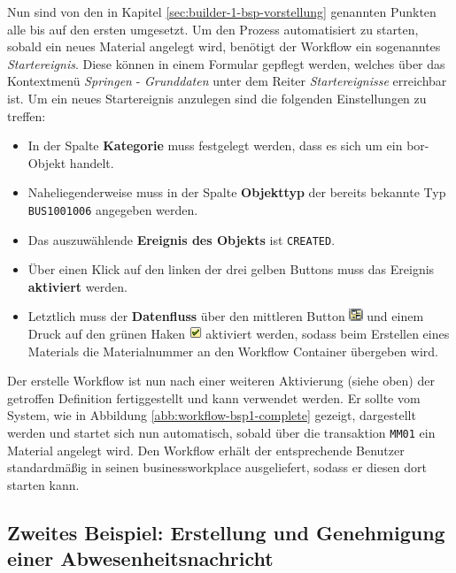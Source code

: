 Nun sind von den in Kapitel \ref{sec:builder-1-bsp-vorstellung} genannten Punkten alle bis auf den ersten umgesetzt. Um den Prozess automatisiert zu starten, sobald ein neues Material angelegt wird, benötigt der Workflow ein sogenanntes \textit{Startereignis}. Diese können in einem Formular gepflegt werden, welches über das Kontextmenü \textit{Springen} - \textit{Grunddaten} unter dem Reiter \textit{Startereignisse} erreichbar ist. Um ein neues Startereignis anzulegen sind die folgenden Einstellungen zu treffen:

\begin{itemize}
	\item In der Spalte \textbf{Kategorie} muss festgelegt werden, dass es sich um ein \gls{bor}-Objekt handelt. 
	\item Naheliegenderweise muss in der Spalte \textbf{Objekttyp} der bereits bekannte Typ \texttt{BUS1001006} angegeben werden.
	\item Das auszuwählende \textbf{Ereignis des Objekts} ist \texttt{CREATED}.
	\item Über einen Klick auf den linken der drei gelben Buttons muss das Ereignis \textbf{aktiviert} werden.
	\item Letztlich muss der \textbf{Datenfluss} über den mittleren Button \includegraphics[height=1em]{grafiken/wf-builder_bsp1_btn-datenfluss.png} und einem Druck auf den grünen Haken \includegraphics[height=1em]{grafiken/btn_sap_apply.png} aktiviert werden, sodass beim Erstellen eines Materials die Materialnummer an den Workflow Container übergeben wird.
\end{itemize}

Der erstelle Workflow ist nun nach einer weiteren Aktivierung (siehe oben) der getroffen Definition fertiggestellt und kann verwendet werden. Er sollte vom System, wie in Abbildung \ref{abb:workflow-bsp1-complete} gezeigt, dargestellt werden und startet sich nun automatisch, sobald über die \gls{transaktion} \texttt{MM01} ein Material angelegt wird. Den Workflow erhält der entsprechende Benutzer standardmäßig in seinen \gls{businessworkplace} ausgeliefert, sodass er diesen dort starten kann.

\subsection{Zweites Beispiel: Erstellung und Genehmigung einer Abwesenheitsnachricht}
\label{sec:builder-2-bsp}

